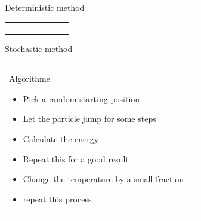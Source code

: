 \begin{frame}{Deterministic method}
\begin{tabular}{l l}
\begin{minipage}{0.6\textwidth}
\begin{block}{}
\begin{figure}
    	  					\end{figure}
    	  		  	\end{block}
    	  	\end{minipage}
    	  	\end{tabular}	
    	
\end{frame}

\begin{frame}{Stochastic method}
  \vspace{-1.5cm}
      	\begin{tabular}{l l}
      	  	\begin{minipage}{0.5\textwidth}
      	  	\begin{block}{Algorithme }
      	  	     	  		\begin{itemize}
      	  	     	  		\item Pick a random starting position
      	  	     	  		\item Let the particle jump for some steps
      	  	     	  		\item Calculate the energy
      	  	     	  		\item Repeat this for a good result
      	  	     	  		\item Change the temperature by a small fraction
      	  	     	  		\item repeat this process
      	  	     	 \end{itemize}
      	  	\end{block}
      	  	\end{minipage}
      	  	\begin{minipage}{0.6\textwidth}
      	  			\begin{block}{}
      	  				\begin{figure}
      	  						\centering

\end{figure}
\end{block}
\end{minipage}
\end{tabular}
\end{frame}
